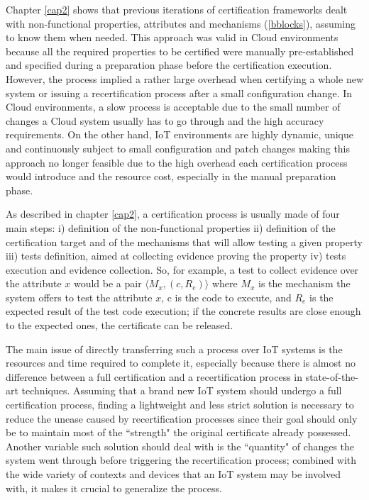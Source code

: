 
Chapter \ref{cap2} shows that previous iterations of certification frameworks dealt with non-functional properties, attributes and mechanisms (\ref{bblocks}), assuming to know them when needed. This approach was valid in Cloud environments because all the required properties to be certified were manually pre-established and specified during a preparation phase before the certification execution. However, the process implied a rather large overhead when certifying a whole new system or issuing a recertification process after a small configuration change. In Cloud environments, a slow process is acceptable due to the small number of changes a Cloud system usually has to go through and the high accuracy requirements. On the other hand, IoT environments are highly dynamic, unique and continuously subject to small configuration and patch changes making this approach no longer feasible due to the high overhead each certification process would introduce and the resource cost, especially in the manual preparation phase.

As described in chapter \ref{cap2}, a certification process is usually made of four main steps: i) definition of the non-functional properties ii) definition of the certification target and of the mechanisms that will allow testing a given property iii) tests definition, aimed at collecting evidence proving the property iv) tests execution and evidence collection. So, for example, a test to collect evidence over the attribute \(x\) would be a pair \( \langle M_x, (c, R_e) \rangle \) where \(M_x\) is the mechanism the system offers to test the attribute \(x\), c is the code to execute, and \(R_e\) is the expected result of the test code execution; if the concrete results are close enough to the expected ones, the certificate can be released.

The main issue of directly transferring such a process over IoT systems is the resources and time required to complete it, especially because there is almost no difference between a full certification and a recertification process in state-of-the-art techniques. Assuming that a brand new IoT system should undergo a full certification process, finding a lightweight and less strict solution is necessary to reduce the unease caused by recertification processes since their goal should only be to maintain most of the ``strength" the original certificate already possessed. Another variable such solution should deal with is the ``quantity" of changes the system went through before triggering the recertification process; combined with the wide variety of contexts and devices that an IoT system may be involved with, it makes it crucial to generalize the process.

